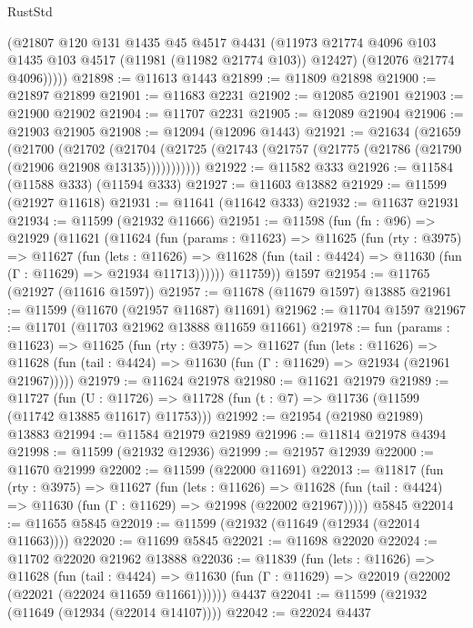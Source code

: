 \begin{lexlean}{RustStd}
\begin{coremodule}
          (@21807
            @120
            @131
            @1435
            @45
            @4517
            @4431
            (@11973 @21774 @4096 @103 @1435 @103 @4517 (@11981 (@11982 @21774 @103)) @12427)
            (@12076 @21774 @4096)))))
@21898 := @11613 @1443
@21899 := @11809 @21898
@21900 := @21897 @21899
@21901 := @11683 @2231
@21902 := @12085 @21901
@21903 := @21900 @21902
@21904 := @11707 @2231
@21905 := @12089 @21904
@21906 := @21903 @21905
@21908 := @12094 (@12096 @1443)
@21921 := @21634
    (@21659
      (@21700
        (@21702
          (@21704 (@21725 (@21743 (@21757 (@21775 (@21786 (@21790 (@21906 @21908 @13135)))))))))))
@21922 := @11582 @333
@21926 := @11584 (@11588 @333) (@11594 @333)
@21927 := @11603 @13882
@21929 := @11599 (@21927 @11618)
@21931 := @11641 (@11642 @333)
@21932 := @11637 @21931
@21934 := @11599 (@21932 @11666)
@21951 := @11598
    (fun (fn : @96) =>
    @21929
      (@11621
        (@11624
          (fun (params : @11623) =>
          @11625
            (fun (rty : @3975) =>
            @11627
              (fun (lets : @11626) =>
              @11628 (fun (tail : @4424) => @11630 (fun (Γ : @11629) => @21934 @11713))))))
        @11759))
    @1597
@21954 := @11765 (@21927 (@11616 @1597))
@21957 := @11678 (@11679 @1597) @13885
@21961 := @11599 (@11670 (@21957 @11687) @11691)
@21962 := @11704 @1597
@21967 := @11701 (@11703 @21962 @13888 @11659 @11661)
@21978 := fun (params : @11623) =>
  @11625
    (fun (rty : @3975) =>
    @11627
      (fun (lets : @11626) =>
      @11628 (fun (tail : @4424) => @11630 (fun (Γ : @11629) => @21934 (@21961 @21967)))))
@21979 := @11624 @21978
@21980 := @11621 @21979
@21989 := @11727
    (fun (U : @11726) => @11728 (fun (t : @7) => @11736 (@11599 (@11742 @13885 @11617) @11753)))
@21992 := @21954 (@21980 @21989) @13883
@21994 := @11584 @21979 @21989
@21996 := @11814 @21978 @4394
@21998 := @11599 (@21932 @12936)
@21999 := @21957 @12939
@22000 := @11670 @21999
@22002 := @11599 (@22000 @11691)
@22013 := @11817
    (fun (rty : @3975) =>
    @11627
      (fun (lets : @11626) =>
      @11628 (fun (tail : @4424) => @11630 (fun (Γ : @11629) => @21998 (@22002 @21967)))))
    @5845
@22014 := @11655 @5845
@22019 := @11599 (@21932 (@11649 (@12934 (@22014 @11663))))
@22020 := @11699 @5845
@22021 := @11698 @22020
@22024 := @11702 @22020 @21962 @13888
@22036 := @11839
    (fun (lets : @11626) =>
    @11628
      (fun (tail : @4424) =>
      @11630 (fun (Γ : @11629) => @22019 (@22002 (@22021 (@22024 @11659 @11661))))))
    @4437
@22041 := @11599 (@21932 (@11649 (@12934 (@22014 @14107))))
@22042 := @22024 @4437

\end{coremodule}
\end{lexlean}
